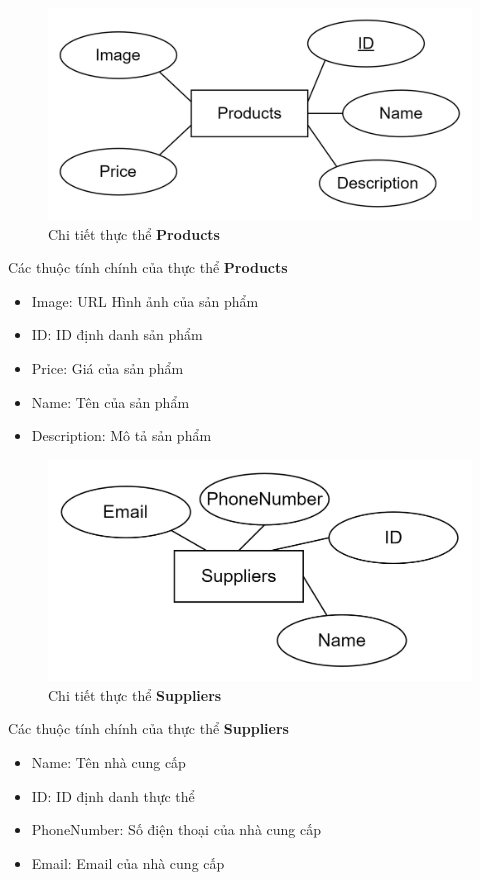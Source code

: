 \newpage
\begin{figure}[h]
    \centering
    \includegraphics[scale = 0.20]{img/db/products.png}
    \vspace{1cm}
    \caption{Chi tiết thực thể \textbf{Products}}
    \label{fig:taskAssignment}
\end{figure}
Các thuộc tính chính của thực thể \textbf{Products}
\begin{itemize}
    \item Image: URL Hình ảnh của sản phẩm
    \item ID: ID định danh sản phẩm
    \item Price: Giá của sản phẩm
    \item Name: Tên của sản phẩm
    \item Description: Mô tả sản phẩm
\end{itemize}


\begin{figure}[h]
    \centering
    \includegraphics[scale = 0.20]{img/db/suppliers.png}
    \vspace{1cm}
    \caption{Chi tiết thực thể \textbf{Suppliers}}
    \label{fig:taskAssignment}
\end{figure}
Các thuộc tính chính của thực thể \textbf{Suppliers}
\begin{itemize}
    \item Name: Tên nhà cung cấp
    \item ID: ID định danh thực thể
    \item PhoneNumber: Số điện thoại của nhà cung cấp
    \item Email: Email của nhà cung cấp
\end{itemize}

